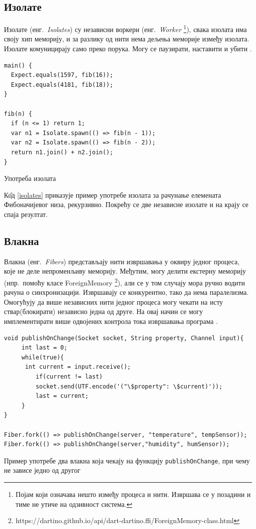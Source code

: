 \documentclass[12pt,oneside]{memoir}
\begin{document}
\subsection{Изолате}
\label{izolate}

Изолате (енг.~\textit{Isolates}) су независни воркери (енг.~\textit{Worker} \footnote{Појам који означава нешто између процеса и нити. Извршава се у позадини и тиме не утиче на одзивност система. }), свака изолата има своју хип меморију, и за разлику од нити нема дељења меморије између изолата. Изолате комуницирају само преко порука. Могу се паузирати, наставити и убити \cite{procesi_i_izolate}.

\begin{listing}
\begin{verbatim}
main() {
  Expect.equals(1597, fib(16));
  Expect.equals(4181, fib(18)); 
}

fib(n) {
  if (n <= 1) return 1;
  var n1 = Isolate.spawn(() => fib(n - 1));
  var n2 = Isolate.spawn(() => fib(n - 2));
  return n1.join() + n2.join();
}
\end{verbatim}
\caption{Употреба изолата}
\label{isolates}
\end{listing}

К\^{о}д \ref{isolates} приказује пример употребе изолата за рачунање елемената Фибоначијевог низа, рекурзивно. Покрећу се две независне изолате и на крају се спаја резултат.

\subsection{Влакна}
\label{vlakna}

Влакна (енг.~\textit{Fibers}) представљају нити извршавања у оквиру једног процеса, које не деле непроменљиву меморију. Међутим, могу делити екстерну меморију (нпр.~помоћу класе ForeignMemory \footnote{https://dartino.github.io/api/dart-dartino.ffi/ForeignMemory-class.html}), али се у том случају мора ручно водити рачуна о синхронизацији. Извршавају се конкурентно, тако да нема паралелизма. Омогућују да више независних нити једног процеса могу чекати на исту ствар(блокирати) независно једна од друге. На овај начин се могу имплементирати више одвојених контрола тока извршавања програма \cite{korutine_i_vlakna}.

\begin{listing}
\begin{verbatim}
void publishOnChange(Socket socket, String property, Channel input){
  	 int last = 0;
  	 while(true){
   	  int current = input.receive();
    	 if(current != last)
      	 socket.send(UTF.encode('("\$property": \$current)'));
    	 last = current;
  	 }
}

Fiber.fork(() => publishOnChange(server, "temperature", tempSensor));
Fiber.fork(() => publishOnChange(server,"humidity", humSensor));
\end{verbatim}
\caption{Пример употребе два влакна која чекају на функцију \texttt{publishOnChange}, при чему не зависе једно од другог}
\label{fibers}
\end{listing}
\end{document}
